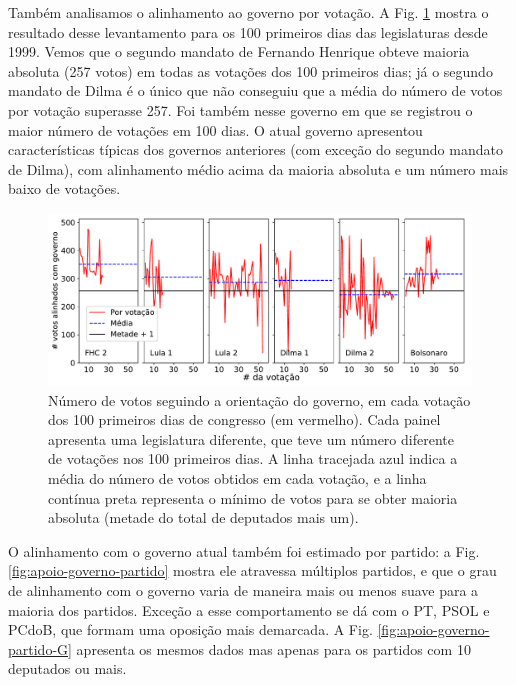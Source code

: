 \documentclass[12pt,a4paper]{article}
\begin{document}
Também analisamos o alinhamento ao governo por votação. A Fig. \ref{fig:apoio-governo-votacao} mostra o resultado
desse levantamento para os 100 primeiros dias das legislaturas desde 1999. Vemos que o segundo mandato
de Fernando Henrique obteve maioria absoluta (257 votos) em todas as votações dos 100 primeiros dias; já
o segundo mandato de Dilma é o único que não conseguiu que a média do número de votos por votação
superasse 257. Foi também nesse governo em que se registrou o maior número de votações em 100 dias.
O atual governo apresentou características típicas dos governos anteriores (com exceção do segundo mandato de Dilma), com alinhamento médio
acima da maioria absoluta e um número mais baixo de votações.

\begin{figure}[H]
\centering
\includegraphics[width=1.0\textwidth]{graficos/apoio_ao_governo_por_votacao_2019-05-09.pdf}
\caption{Número de votos seguindo a orientação do governo, em cada votação dos 100 primeiros
  dias de congresso (em vermelho). Cada painel apresenta uma legislatura diferente, que teve
  um número diferente de votações nos 100 primeiros dias. A linha tracejada azul indica a média
  do número de votos obtidos em cada votação, e a linha contínua preta representa o mínimo de
  votos para se obter maioria absoluta (metade do total de deputados mais um).}
\label{fig:apoio-governo-votacao}
\end{figure} 

O alinhamento com o governo atual também foi estimado por partido: a Fig. \ref{fig:apoio-governo-partido} mostra ele atravessa múltiplos partidos, e que o grau de alinhamento com o governo varia de maneira
mais ou menos suave para a maioria dos partidos. Exceção a esse comportamento se dá com o PT, PSOL e
PCdoB, que formam uma oposição mais demarcada. A Fig. \ref{fig:apoio-governo-partido-G} apresenta os
mesmos dados mas apenas para os partidos com 10 deputados ou mais.
\end{document}
